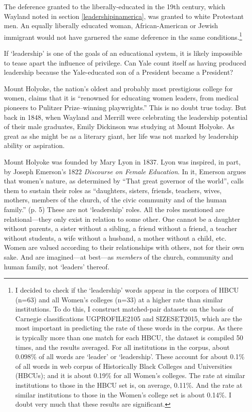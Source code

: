 The deference granted to the liberally-educated in the 19th century, which Wayland noted in section \ref{leadershipinamerica}, was granted to white Protestant men. An equally liberally educated woman, African-American or Jewish immigrant would not have garnered the same deference in the same conditions.\footnote{I decided to check if the `leadership' words appear in the corpora of HBCU (n=63) and all Women's colleges (n=33) at a higher rate than similar institutions. To do this, I construct matched-pair datasets on the basis of Carnegie classifications UGPROFILE2105 and SIZESET2015, which are the most important in predicting the rate of these words in the corpus. As there is typically more than one match for each HBCU, the dataset is compiled 50 times, and the results averaged.
For all institutions in the corpus, about 0.098\% of all words are `leader' or `leadership'. These account for about 0.1\% of all words in web corpus of Historically Black Colleges and Universities (HBCUs); and it is about 0.19\% for all Women's colleges. The rate at similar institutions to those in the HBCU set is, on average, 0.11\%. And the rate at similar institutions to those in the Women's college set is about 0.14\%. I doubt very much that these results are significant.} 

If `leadership' is one of the goals of an educational system, it is likely impossible to tease apart the influence of privilege. Can Yale count itself as having produced leadership because the Yale-educated son of a President became a President? 

Mount Holyoke, the nation's oldest and probably most prestigious college for women, claims that it is ``renowned for educating women leaders, from medical pioneers to Pulitzer Prize–winning playwrights.'' This is no doubt true today. But back in 1848, when Wayland and Merrill were celebrating the leadership potential of their male graduates, Emily Dickinson was studying at Mount Holyoke. As great as she might be as a literary giant, her life was not marked by leadership ability or aspiration.

Mount Holyoke was founded by Mary Lyon in 1837. Lyon was inspired, in part, by Joseph Emerson's 1822 \emph{Discourse on Female Education}. In it, Emerson argues that women's nature, as determined by ``That great governor of the world'', calls them to sustain their roles as ``daughters, sisters, friends, teachers, wives, mothers, members of the church, of the civic community and of the human family.'' (p. 5) These are not `leadership' roles. All the roles mentioned are relational---they only exist in relation to some other. One cannot be a daughter without parents, a sister without a sibling, a friend without a friend, a teacher without students, a wife without a husband, a mother without a child, etc. Women are valued according to their relationships with others, not for their own sake. And are imagined---at best---as \emph{members} of the church, community and human family, not `leaders' thereof. 


